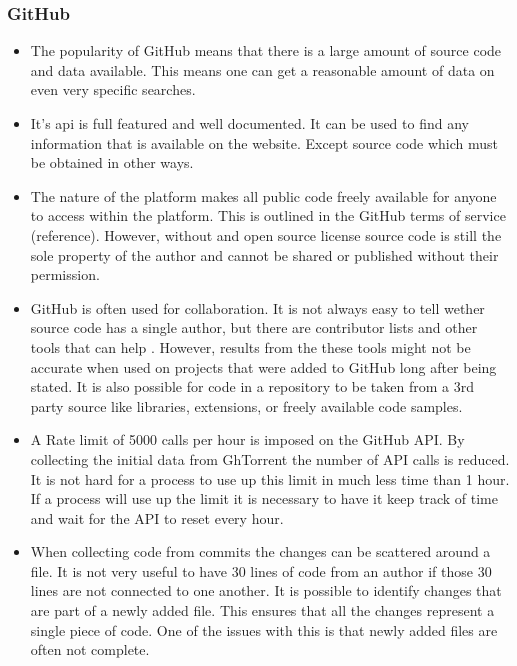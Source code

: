 \documentclass{article}
\begin{document}
\subsubsection*{GitHub}
\begin{itemize}
    \item The popularity of GitHub means that there is a large amount of source code and data available. This means one can get a reasonable amount of data on even very specific searches.

    \item It's api is full featured and well documented. It can be used to find any information that is available on the website. Except source code which must be obtained in other ways.
    
    \item The nature of the platform makes all public code freely available for anyone to access within the platform. This is outlined in the GitHub terms of service (reference). However, without and open source license source code is still the sole property of the author and cannot be shared or published without their permission.

    \item GitHub is often used for collaboration. It is not always easy to tell wether source code has a single author, but there are contributor lists and other tools that can help \cite{Yang2017}\cite{Matyukhina2019}. However, results from the these tools might not be accurate when used on projects that were added to GitHub long after being stated. It is also possible for code in a repository to be taken from a 3rd party source like libraries, extensions, or freely available code samples.

    \item A Rate limit of 5000 calls per hour is imposed on the GitHub API. By collecting the initial data from GhTorrent the number of API calls is reduced. It is not hard for a process to use up this limit in much less time than 1 hour. If a process will use up the limit it is necessary to have it keep track of time and wait for the API to reset every hour.

    \item When collecting code from commits the changes can be scattered around a file. It is not very useful to have 30 lines of code from an author if those 30 lines are not connected to one another. It is possible to identify changes that are part of a newly added file. This ensures that all the changes represent a single piece of code. One of the issues with this is that newly added files are often not complete.
\end{itemize}
\end{document}
